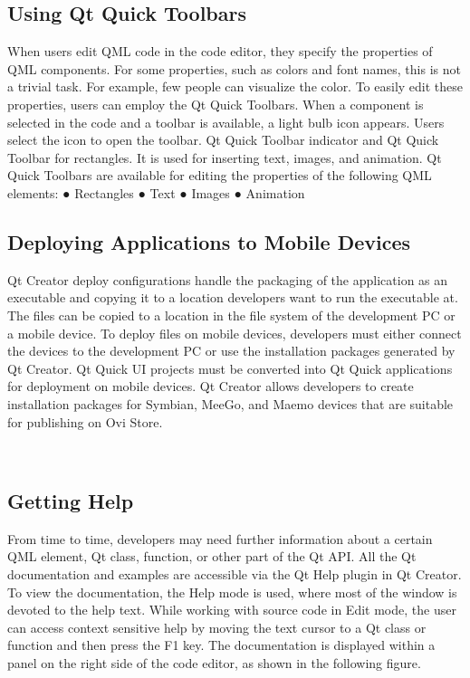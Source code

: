 \subsection{Using Qt Quick Toolbars}


When  users  edit  QML  code  in  the  code  editor,  they  specify  the  properties  of  QML   components.  For
some  properties,  such  as  colors   and  font  names,  this  is  not  a  trivial  task.  For  example,  few  people  can
visualize the color.
To  easily  edit these properties, users can employ the Qt Quick Toolbars. When a component is selected
in  the  code  and  a  toolbar  is  available,  a  light  bulb  icon  appears.  Users  select  the  icon  to  open  the
toolbar.
Qt  Quick  Toolbar  indicator  and  Qt  Quick  Toolbar  for  rectangles.  It  is  used  for  inserting  text,  images,
and  animation.  Qt  Quick  Toolbars  are  available  for  editing  the  properties  of  the  following  QML
elements:
● Rectangles
● Text
● Images
● Animation


\subsection{Deploying Applications to Mobile Devices}

Qt Creator deploy configurations handle the packaging of the application as an executable and copying it
to  a  location  developers  want  to  run  the  executable  at.  The  files  can  be  copied  to  a  location  in  the  file
system  of  the  development  PC  or  a  mobile  device.  To  deploy  files  on  mobile devices, developers must
either  connect  the  devices  to  the  development  PC  or  use  the  installation  packages  generated  by  Qt
Creator.  Qt  Quick  UI  projects  must  be  converted into Qt Quick applications for deployment on mobile devices.
Qt  Creator  allows developers to  create installation packages for Symbian, MeeGo, and Maemo devices
that are suitable for publishing on Ovi Store.


\
\
\


\subsection{Getting Help}

From  time  to  time,  developers  may  need  further  information  about  a  certain  QML  element,  Qt  class,
function,  or  other  part  of  the  Qt  API.  All   the  Qt  documentation  and  examples are accessible via the Qt
Help plugin in Qt Creator.
To  view  the  documentation,   the  Help  mode  is  used,  where  most  of  the  window  is  devoted  to  the  help
text.  While working with source code in Edit mode, the user can access context sensitive help by moving
the  text  cursor  to  a  Qt  class  or   function  and  then  press  the  F1  key.  The  documentation  is  displayed
within a panel on the right side of the code editor, as shown in the following figure.

